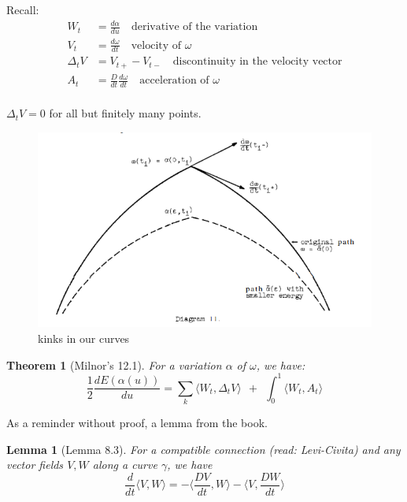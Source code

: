 \documentclass{article}
\newtheorem{thm}{Theorem}
\newtheorem*{lemm*}{Lemma}
\newcommand{\angle}[1]{\langle #1 \rangle}
\begin{document}
Recall:
\[
    \begin{align*}
        W_t &= \frac{d\alpha}{du} \quad\text{derivative of the variation} \\
        V_t &= \frac{d\omega}{dt} \quad\text{velocity of $\omega$} \\
        \Delta_tV &= V_{t+} - V_{t-} \quad\text{discontinuity in the velocity vector} \\
        A_t &= \frac{D}{dt} \frac{d\omega}{dt} \quad\text{acceleration of $\omega$} \\
    \end{align*}
\]

$\Delta_tV = 0$ for all but finitely many points.

\begin{figure}
    \includegraphics{img/kinky.png}
    \caption{kinks in our curves}
    \label{fig:kinky}
\end{figure}



\begin{thm}[Milnor's 12.1]
    \label{thm:12.1}
    For a variation $\alpha$ of $\omega$, we have:
    \[
        \frac{1}{2} \frac{dE(\alpha(u))}{du} =
        \sum_{k} \angle{ W_t, \Delta_tV } \ \ + \ \ \int_0^1 \angle{ W_t, A_t }
    \]
\end{thm}

As a reminder without proof, a lemma from the book.

\begin{lemm*}[Lemma 8.3]
    For a compatible connection (read: Levi-Civita) and any vector fields $V,W$ along a curve
    $\gamma$, we have
    \[
        \frac{d}{dt}\langle V, W \rangle   =
        - \langle \frac{DV}{dt}, W \rangle - \langle V, \frac{DW}{dt} \rangle
    \]
\end{lemm*}
\end{document}
